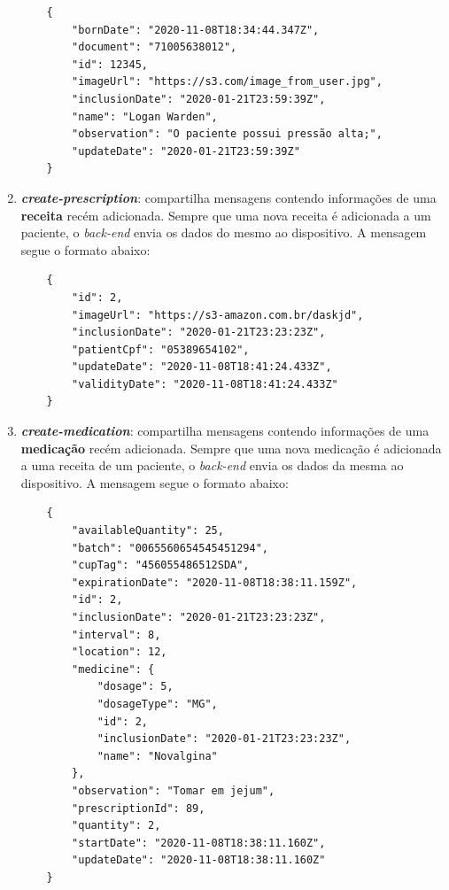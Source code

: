 \begin{enumerate}
        \begin{verbatim}
    {
        "bornDate": "2020-11-08T18:34:44.347Z",
        "document": "71005638012",
        "id": 12345,
        "imageUrl": "https://s3.com/image_from_user.jpg",
        "inclusionDate": "2020-01-21T23:59:39Z",
        "name": "Logan Warden",
        "observation": "O paciente possui pressão alta;",
        "updateDate": "2020-01-21T23:59:39Z"
    }
    \end{verbatim}
    
    \item \textbf{\textit{create-prescription}}: compartilha mensagens contendo informações de uma \textbf{receita} recém adicionada. Sempre que uma nova receita é adicionada a um paciente, o \textit{back-end} envia os dados do mesmo ao dispositivo. A mensagem segue o formato abaixo:
    
        \begin{verbatim}
    {
        "id": 2,
        "imageUrl": "https://s3-amazon.com.br/daskjd",
        "inclusionDate": "2020-01-21T23:23:23Z",
        "patientCpf": "05389654102",
        "updateDate": "2020-11-08T18:41:24.433Z",
        "validityDate": "2020-11-08T18:41:24.433Z"
    }
    \end{verbatim}
    
    \item \textbf{\textit{create-medication}}: compartilha mensagens contendo informações de uma \textbf{medicação} recém adicionada. Sempre que uma nova medicação é adicionada a uma receita de um paciente, o \textit{back-end} envia os dados da mesma ao dispositivo. A mensagem segue o formato abaixo:
    
        \begin{verbatim}
    {
        "availableQuantity": 25,
        "batch": "0065560654545451294",
        "cupTag": "456055486512SDA",
        "expirationDate": "2020-11-08T18:38:11.159Z",
        "id": 2,
        "inclusionDate": "2020-01-21T23:23:23Z",
        "interval": 8,
        "location": 12,
        "medicine": {
            "dosage": 5,
            "dosageType": "MG",
            "id": 2,
            "inclusionDate": "2020-01-21T23:23:23Z",
            "name": "Novalgina"
        },
        "observation": "Tomar em jejum",
        "prescriptionId": 89,
        "quantity": 2,
        "startDate": "2020-11-08T18:38:11.160Z",
        "updateDate": "2020-11-08T18:38:11.160Z"
    }
    \end{verbatim}


\end{enumerate}
